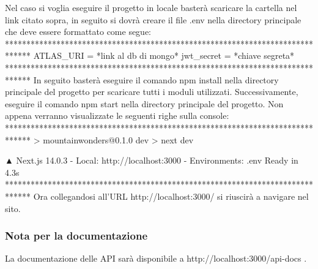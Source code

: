 \documentclass[a4paper,12pt]{article}
\begin{document}
Nel caso si voglia eseguire il progetto in locale basterà scaricare la cartella nel link citato  sopra, in seguito si dovrà creare il file .env nella directory principale che deve essere formattato come segue: \newline
\newline
******************************************************************************
\newline ATLAS\_URI = *link al db di mongo* \newline
jwt\_secret = *chiave segreta* \newline \newline
******************************************************************************
\newline
In seguito basterà eseguire il comando npm install nella directory principale del progetto per scaricare tutti i moduli utilizzati. Successivamente, eseguire il comando npm start nella directory principale del progetto. Non appena verranno visualizzate le seguenti righe sulla console:
\newline
\newline
******************************************************************************
\newline 
> mountainwonders@0.1.0 dev \newline
> next dev \newline

   ▲ Next.js 14.0.3 \newline
   - Local: http://localhost:3000 \newline
   - Environments: .env \newline
\newline
  Ready in 4.3s \newline \newline
******************************************************************************
\newline
Ora collegandosi all’URL http://localhost:3000/ si riuscirà a navigare nel sito.
\newline 
\subsubsection{Nota per la documentazione}
La documentazione delle API sarà disponibile a http://localhost:3000/api-docs . 
\end{document}
